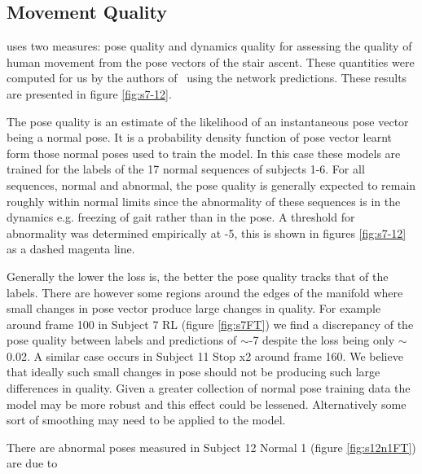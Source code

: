 \documentclass[11pt]{article} %
\begin{document}
\subsection{Movement Quality}

\cite{Paiement} uses two measures: pose quality and dynamics quality for assessing the quality of human movement from the pose vectors of the stair ascent. These quantities were computed for us by the authors of~\cite{Paiement} using the network predictions. These results are presented in figure \ref{fig:s7-12}. 

The pose quality is an estimate of the likelihood of an instantaneous pose vector being a normal pose. It is a probability density function of pose vector learnt form those normal poses used to train the model. In this case these models are trained for the labels of the 17 normal sequences of subjects 1-6. For all sequences, normal and abnormal, the pose quality is generally expected to remain roughly within normal limits since the abnormality of these sequences is in the dynamics e.g. freezing of gait rather than in the pose. A threshold for abnormality was determined empirically at -5, this is shown in figures \ref{fig:s7-12} as a dashed magenta line.

Generally the lower the loss is, the better the pose quality tracks that of the labels. There are however some regions around the edges of the manifold where small changes in pose vector produce large changes in quality. For example around frame 100 in Subject 7 RL (figure \ref{fig:s7FT}) we find a discrepancy of the pose quality between labels and predictions of $\sim$-7 despite the loss being only $\sim$0.02. A similar case occurs in Subject 11 Stop x2 around frame 160. We believe that ideally such small changes in pose should not be producing such large differences in quality. Given a greater collection of normal pose training data the model may be more robust and this effect could be lessened. Alternatively some sort of smoothing may need to be applied to the model. 

There are abnormal poses measured in Subject 12 Normal 1 (figure \ref{fig:s12n1FT}) are due to 
\end{document}
